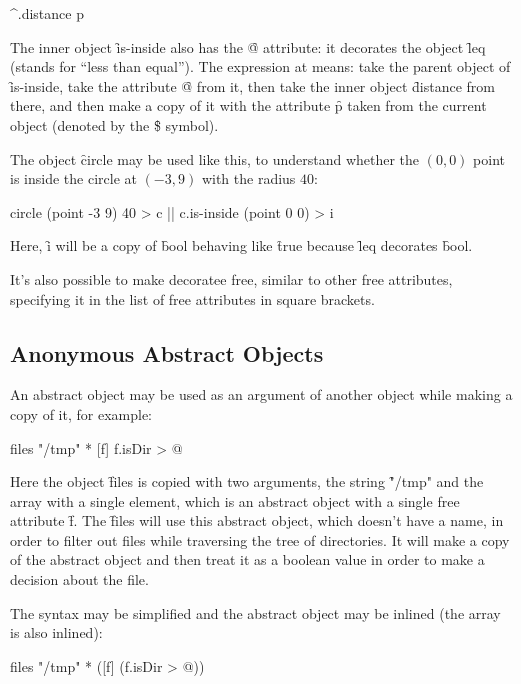 \begin{eocode}
^.distance p
\end{eocode}

The inner object \f{is-inside} also has the \f{@} attribute: it
decorates the object \f{leq} (stands for ``less than equal'').
The expression at  means:
take the parent object of \f{is-inside},
take the attribute \f{@} from it, then take the inner object \f{distance}
from there, and then make a copy of it with the attribute \f{p}
taken from the current object (denoted by the \f{\$} symbol).

The object \f{circle} may be used like this, to understand whether
the $(0,0)$ point is inside the circle at $(-3,9)$ with the radius $40$:

\begin{eocode}
circle (point -3 9) 40 > c  |$\label{ln:circle-c}$|
c.is-inside (point 0 0) > i
\end{eocode}

Here, \f{i} will be a copy of \f{bool} behaving like \f{true}
because \f{leq} decorates \f{bool}.

It's also possible to make decoratee free, similar to other free
attributes, specifying it in the list of free attributes in
square brackets.

\subsection{Anonymous Abstract Objects}

An abstract object may be used as an argument of another object while
making a copy of it, for example:

\begin{eocode}
files
  "/tmp"
  *
    [f]
      f.isDir > @
\end{eocode}

Here the object \f{files} is copied with two arguments, the string
\f{"/tmp"} and the array with a single element, which is an
abstract object with a single free attribute \f{f}. The \f{files}
will use this abstract object, which doesn't have a name, in order
to filter out files while traversing the tree of directories. It will
make a copy of the abstract object and then treat it as a boolean
value in order to make a decision about the file.

The syntax may be simplified and the abstract object may be inlined
(the array is also inlined):

\begin{eocode}
files
  "/tmp"
  * ([f] (f.isDir > @))
\end{eocode}

